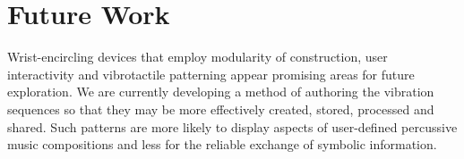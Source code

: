 \documentclass{chi-ext}
\begin{document}
\section{Future Work}
Wrist-encircling devices that employ modularity of construction, user interactivity and vibrotactile patterning appear promising areas for future exploration. We are currently developing a method of authoring the vibration sequences so that they may be more effectively created, stored, processed and shared. Such patterns are more likely to display aspects of user-defined percussive music compositions and less for the reliable exchange of symbolic information.



\end{document}
